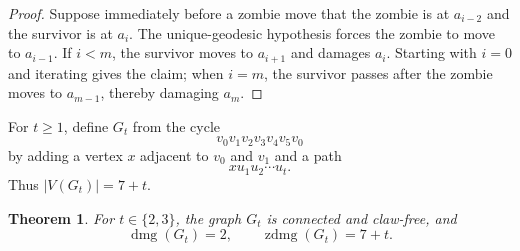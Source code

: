 \documentclass[11pt]{amsart}
\newtheorem{theorem}{Theorem}
\DeclareMathOperator{\dmg}{dmg}
\DeclareMathOperator{\zdmg}{zdmg}
\begin{document}
\begin{proof}
Suppose immediately before a zombie move that the zombie is at $a_{i-2}$ and
the survivor is at $a_i$. The unique-geodesic hypothesis forces the zombie
to move to $a_{i-1}$. If $i<m$, the survivor moves to $a_{i+1}$ and damages
$a_i$. Starting with $i=0$ and iterating gives the claim; when $i=m$, the
survivor passes after the zombie moves to $a_{m-1}$, thereby damaging $a_m$.
\end{proof}

For $t\geq1$, define $G_t$ from the cycle
\[
  v_0v_1v_2v_3v_4v_5v_0
\]
by adding a vertex $x$ adjacent to $v_0$ and $v_1$ and a path
\[
  xu_1u_2\cdots u_t.
\]
Thus $|V(G_t)|=7+t$.

\begin{theorem}\label{thm:values}
For $t\in\{2,3\}$, the graph $G_t$ is connected and claw-free, and
\[
  \dmg(G_t)=2,
  \qquad
  \zdmg(G_t)=7+t.
\]
\end{theorem}
\end{document}
